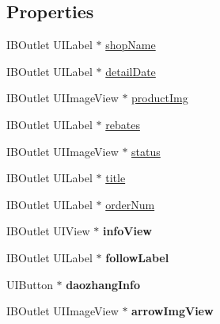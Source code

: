 \subsection*{Properties}
\begin{DoxyCompactItemize}
\item 
I\+B\+Outlet U\+I\+Label $\ast$ \mbox{\hyperlink{interface_order_list_cell_a35042705fba96c11811c238f609eb297}{shop\+Name}}
\item 
I\+B\+Outlet U\+I\+Label $\ast$ \mbox{\hyperlink{interface_order_list_cell_a14fb3c804ee59ead288729ea172e8e1f}{detail\+Date}}
\item 
I\+B\+Outlet U\+I\+Image\+View $\ast$ \mbox{\hyperlink{interface_order_list_cell_afd72abf529b61c8d05bec060078753e2}{product\+Img}}
\item 
I\+B\+Outlet U\+I\+Label $\ast$ \mbox{\hyperlink{interface_order_list_cell_a8c59cec95f3391e63ac5781c6a18aa40}{rebates}}
\item 
I\+B\+Outlet U\+I\+Image\+View $\ast$ \mbox{\hyperlink{interface_order_list_cell_ad65b123d7d99ffa7ad343a2b7139f60b}{status}}
\item 
I\+B\+Outlet U\+I\+Label $\ast$ \mbox{\hyperlink{interface_order_list_cell_a71cc21ed2ecbf39ca27669c27b3c3277}{title}}
\item 
I\+B\+Outlet U\+I\+Label $\ast$ \mbox{\hyperlink{interface_order_list_cell_aa5bb1c72b36a4d9163deb932de6dabd0}{order\+Num}}
\item 
\mbox{\label{interface_order_list_cell_a01161fec1fbec2203fcb94ab779a6784}} 
I\+B\+Outlet U\+I\+View $\ast$ {\bfseries info\+View}
\item 
\mbox{\label{interface_order_list_cell_aaa6c15f980355a9808017b3a60bcd924}} 
I\+B\+Outlet U\+I\+Label $\ast$ {\bfseries follow\+Label}
\item 
\mbox{\label{interface_order_list_cell_a402dcf6147e90d8e8277bbd5fb71ca60}} 
U\+I\+Button $\ast$ {\bfseries daozhang\+Info}
\item 
\mbox{\label{interface_order_list_cell_a04319738cdb2a6fc682af06d8ac022f2}} 
I\+B\+Outlet U\+I\+Image\+View $\ast$ {\bfseries arrow\+Img\+View}
\item 
\mbox{\label{interface_order_list_cell_a5ca28b724210618b3d49a49d643570d9}} 

\end{DoxyCompactItemize}
